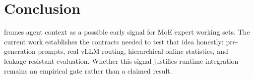 \section{Conclusion}

\project frames agent context as a possible early signal for MoE expert working
sets. The current work establishes the contracts needed to test that idea
honestly: pre-generation prompts, real vLLM routing, hierarchical online
statistics, and leakage-resistant evaluation. Whether this signal justifies
runtime integration remains an empirical gate rather than a claimed result.
